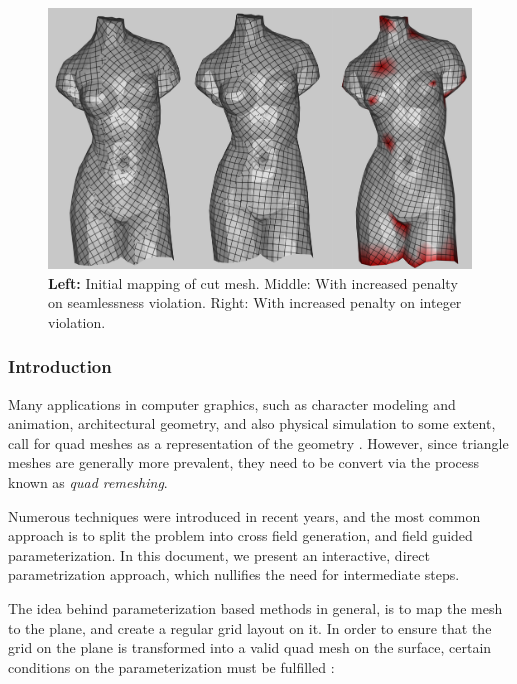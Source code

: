 % 
% 
%
\begin{figure}[ht]
\centering
\includegraphics[width=15cm]{figures/teaser.png}
\caption{\textbf{Left:} Initial mapping of cut mesh. {Middle:} With increased penalty on seamlessness violation. {Right:} With increased penalty on integer violation.}
\label{fig:teaser}
\end{figure}

\subsubsection{Introduction}
Many applications in computer graphics, such as character modeling and animation, architectural geometry, and also physical simulation to some extent, call for quad meshes as a representation of the geometry \cite{10.1111/cgf.12014}. However, since triangle meshes are generally more prevalent, they need to be convert via the process known as \emph{quad remeshing}.

\noindent Numerous techniques were introduced in recent years, and the most common approach is to split the problem into cross field generation, and field guided parameterization. In this document, we present an interactive, direct parametrization approach, which nullifies the need for intermediate steps.

\noindent The idea behind parameterization based methods in general, is to map the mesh to the plane, and create a regular grid layout on it. In order to ensure that the grid on the plane is transformed into a valid quad mesh on the surface, certain conditions on the parameterization must be fulfilled \cite{bommes:hal-00862648}:


